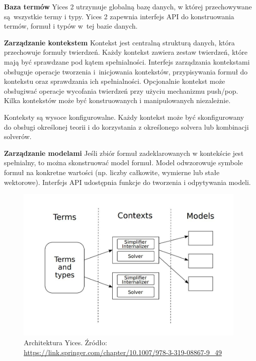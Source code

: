 \textbf{Baza termów} Yices 2 utrzymuje globalną bazę danych, w której przechowywane są~wszystkie termy i typy.
Yices 2 zapewnia interfejs API do konstruowania termów, formuł i typów w~tej bazie danych.

\textbf{Zarządzanie kontekstem} Kontekst jest centralną strukturą danych, która przechowuje formuły twierdzeń.
Każdy kontekst zawiera zestaw twierdzeń, które mają być sprawdzane pod kątem spełnialności. Interfejs zarządzania kontekstami obsługuje operacje tworzenia i~inicjowania kontekstów, przypisywania formuł do kontekstu oraz sprawdzania ich spełnialności. Opcjonalnie kontekst może obsługiwać operacje wycofania twierdzeń przy użyciu mechanizmu push/pop. Kilka kontekstów może być konstruowanych i manipulowanych niezależnie.

Konteksty są wysoce konfigurowalne. Każdy kontekst może być skonfigurowany do obsługi określonej teorii i do korzystania z określonego solvera lub kombinacji solverów.

\textbf{Zarządzanie modelami} Jeśli zbiór formuł zadeklarowanych w kontekście jest spełnialny, to można skonstruować model formuł. Model odwzorowuje symbole formuł na konkretne wartości (np. liczby całkowite, wymierne lub stałe wektorowe). Interfejs API udostępnia funkcje do tworzenia i odpytywania modeli.

\begin{figure}[htbp]
	\centering
	\begin{minipage}{\textwidth}
		\includegraphics[width=\textwidth]{./figures/yices_architecture}
		\caption{Architektura Yices. Źródło: \url{https://link.springer.com/chapter/10.1007/978-3-319-08867-9_49}}
		\label{fig:yices}
	\end{minipage}
\end{figure}

